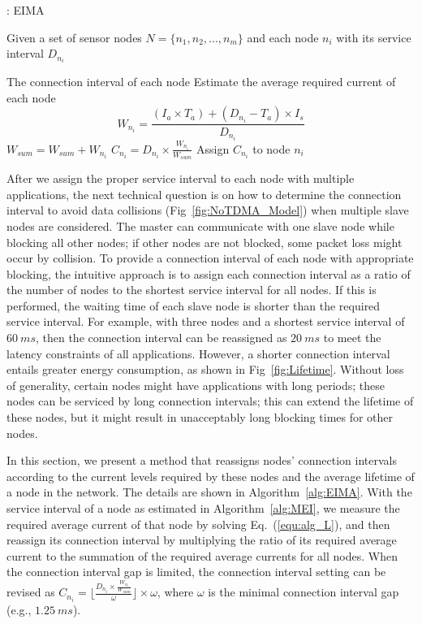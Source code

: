 \documentclass[10pt,journal,compsoc]{IEEEtran}
\newcommand{\algorithmicinput}{\textbf{Input:}}
\newcommand{\INPUT}{\item[\algorithmicinput]}
\newcommand{\algorithmicoutput}{\textbf{Output:}}
\newcommand{\OUTPUT}{\item[\algorithmicoutput]}
\begin{document}
\begin{algorithm}[h!]
    \caption{: EIMA}
    \label{alg:EIMA}
    \begin{algorithmic}[1]

        \INPUT
           Given a set of sensor nodes $N=\{n_1, n_2, ..., n_m\}$ and each node $n_i$ with its service interval $D_{n_i}$
        \OUTPUT
            The connection interval of each node
            \State Estimate the average required current of each node
                \begin{equation}
                W_{n_i}=\frac{(I_{a} \times T_{a})+(D_{n_i} - T_{a})\times{I_s}}{D_{n_i}}  \label{equ:alg_L}
                \end{equation}
            \State  $W_{sum}=W_{sum}+ W_{n_i}$
        \EndFor
            \State  $C_{n_i}=D_{n_i} \times \frac{W_{n_i}}{W_{sum}}$
            \State Assign $C_{n_i}$ to node $n_i$
        \EndFor
    \end{algorithmic}
\end{algorithm}

After we assign the proper service interval to each node with multiple applications, the next technical question is on how to determine the connection interval to avoid data collisions (Fig~\ref{fig:NoTDMA_Model}) when multiple slave nodes are considered. The master can communicate with one slave node while blocking all other nodes; if other nodes are not blocked, some packet loss might occur by collision. To provide a connection interval of each node with appropriate blocking, the intuitive approach is to assign each connection interval as a ratio of the number of nodes to the shortest service interval for all nodes. If this is performed, the waiting time of each slave node is shorter than the required service interval. For example, with three nodes and a shortest service interval of $60~ms$, then the connection interval can be reassigned as $20~ms$ to meet the latency constraints of all applications. However, a shorter connection interval entails greater energy consumption, as shown in Fig~\ref{fig:Lifetime}. Without loss of generality, certain nodes might have applications with long periods; these nodes can be serviced by long connection intervals; this can extend the lifetime of these nodes, but it might result in unacceptably long blocking times for other nodes.

In this section, we present a method that reassigns nodes' connection intervals according to the current levels required by these nodes and the average lifetime of a node in the network. The details are shown in Algorithm~\ref{alg:EIMA}. With the service interval of a node as estimated in Algorithm~\ref{alg:MEI}, we measure the required average current of that node by solving Eq.~(\ref{equ:alg_L}), and then reassign its connection interval by multiplying the ratio of its required average current to the summation of the required average currents for all nodes. When the connection interval gap is limited, the connection interval setting can be revised as $C_{n_i}=\lfloor \frac{D_{n_i} \times \frac{W_{n_i}}{W_{sum}}}{\omega}\rfloor \times \omega$, where $\omega$ is the minimal connection interval gap (e.g., $1.25~ms$).
\end{document}
